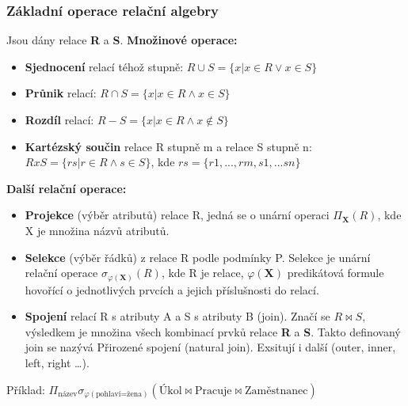 \subsubsection{Základní operace relační algebry}
Jsou dány relace \textbf{R} a \textbf{S}. \textbf{Množinové operace:}
\begin{itemize}
\item \textbf{Sjednocení} relací téhož stupně:      $R \cup S = \{x | x \in R \vee x \in S\}$
\item \textbf{Průnik} relací:                                 $R \cap S = \{x | x \in R \wedge x \in S\}$
\item \textbf{Rozdíl} relací:                                   $R  -  S = \{x | x \in R \wedge x \notin S\}$
\item \textbf{Kartézský součin} relace R stupně m a relace S stupně n: $R x S = \{rs | r \in R \wedge s \in S\}$,  kde  $rs = \{r1,...,rm,s1,...sn\}$
\end{itemize}
\textbf{Další relační operace: }
\begin{itemize}
\item \textbf{Projekce} (výběr atributů) relace R, jedná se o unární operaci $\Pi_\mathbf{X}( R )$, kde X je množina názvů atributů.
\item \textbf{Selekce} (výběr řádků) z relace R podle podmínky P. Selekce je unární relační operace $\sigma_{\varphi(\mathbf{X})}( R )$, kde R je relace, $\varphi(\mathbf{X})$ predikátová formule hovořící o jednotlivých prvcích a jejich příslušnosti do relací.
\item \textbf{Spojení} relací R s atributy A  a  S  s atributy  B (join).  Značí se $R \bowtie S$, výsledkem je množina všech kombinací prvků relace \textbf{R} a \textbf{S}. Takto definovaný join se nazývá Přirozené spojení (natural join). Exsitují i další (outer, inner, left, right \ldots).
\end{itemize}

Příklad: $\Pi_\textrm{název} \sigma_{\varphi(\textrm{pohlaví=žena})} (\textrm{Úkol}\bowtie\textrm{Pracuje}\bowtie\textrm{Zaměstnanec})$


